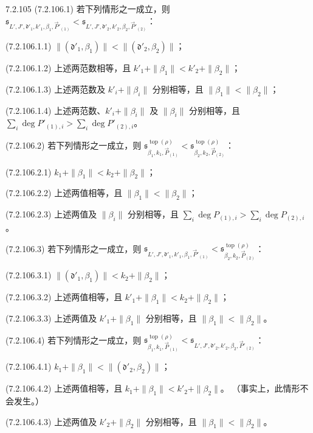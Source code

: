 \begin{definition}{7.2.105}\label{def:7-2-105}
\noindent\textup{(7.2.106.1)}\quad
若下列情形之一成立，则
$\mathfrak s_{L',J',\mathfrak d'_1,k'_1,\beta_1,\vec P'_{(1)}}
<\mathfrak s_{L',J',\mathfrak d'_2,k'_2,\beta_2,\vec P'_{(2)}}$：

\noindent\textup{(7.2.106.1.1)}\quad
$\|(\mathfrak d'_1,\beta_1)\|<\|(\mathfrak d'_2,\beta_2)\|$；

\noindent\textup{(7.2.106.1.2)}\quad
上述两范数相等，且
$k'_1+\|\beta_1\|<k'_2+\|\beta_2\|$；

\noindent\textup{(7.2.106.1.3)}\quad
上述两范数及 $k'_i+\|\beta_i\|$ 分别相等，且
$\|\beta_1\|<\|\beta_2\|$；

\noindent\textup{(7.2.106.1.4)}\quad
上述两范数、$k'_i+\|\beta_i\|$ 及
$\|\beta_i\|$ 分别相等，且
$\sum_i\deg P'_{(1),i}>
\sum_i\deg P'_{(2),i}$。

\noindent\textup{(7.2.106.2)}\quad
若下列情形之一成立，则
$\mathfrak s^{\operatorname{top}(\rho)}_{\beta_1,k_1,\vec P_{(1)}}
<\mathfrak s^{\operatorname{top}(\rho)}_{\beta_2,k_2,\vec P_{(2)}}$：

\noindent\textup{(7.2.106.2.1)}\quad
$k_1+\|\beta_1\|<k_2+\|\beta_2\|$；

\noindent\textup{(7.2.106.2.2)}\quad
上述两值相等，且 $\|\beta_1\|<\|\beta_2\|$；

\noindent\textup{(7.2.106.2.3)}\quad
上述两值及 $\|\beta_i\|$ 分别相等，且
$\sum_i\deg P_{(1),i}>
\sum_i\deg P_{(2),i}$。

\noindent\textup{(7.2.106.3)}\quad
若下列情形之一成立，则
$\mathfrak s_{L',J',\mathfrak d'_1,k'_1,\beta_1,\vec P'_{(1)}}
<\mathfrak s^{\operatorname{top}(\rho)}_{\beta_2,k_2,\vec P_{(2)}}$：

\noindent\textup{(7.2.106.3.1)}\quad
$\|(\mathfrak d'_1,\beta_1)\|<k_2+\|\beta_2\|$；

\noindent\textup{(7.2.106.3.2)}\quad
上述两值相等，且
$k'_1+\|\beta_1\|<k_2+\|\beta_2\|$；

\noindent\textup{(7.2.106.3.3)}\quad
上述两值及 $k'_1+\|\beta_1\|$ 分别相等，且
$\|\beta_1\|<\|\beta_2\|$。

\noindent\textup{(7.2.106.4)}\quad
若下列情形之一成立，则
$\mathfrak s^{\operatorname{top}(\rho)}_{\beta_1,k_1,\vec P_{(1)}}
<\mathfrak s_{L',J',\mathfrak d'_2,k'_2,\beta_2,\vec P'_{(2)}}$：

\noindent\textup{(7.2.106.4.1)}\quad
$k_1+\|\beta_1\|<\|(\mathfrak d'_2,\beta_2)\|$；

\noindent\textup{(7.2.106.4.2)}\quad
上述两值相等，且
$k_1+\|\beta_1\|<k'_2+\|\beta_2\|$。
（事实上，此情形不会发生。）

\noindent\textup{(7.2.106.4.3)}\quad
上述两值及 $k'_2+\|\beta_2\|$ 分别相等，且
$\|\beta_1\|<\|\beta_2\|$。
\end{definition}

